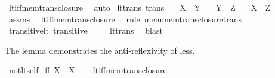 \begin{isabellebody}
\ lt{\isacharunderscore}{\kern0pt}iff{\isacharunderscore}{\kern0pt}mem{\isacharunderscore}{\kern0pt}trans{\isacharunderscore}{\kern0pt}closure\ \isamarkupfalse%
\ auto%
\endisatagproof
{\isafoldproof}%
%
\isadelimproof
\isanewline
%
\endisadelimproof
\isanewline
{}\isamarkupfalse%
\ lt{\isacharunderscore}{\kern0pt}trans\ {\isacharbrackleft}{\kern0pt}trans{\isacharbrackright}{\kern0pt}{\isacharcolon}{\kern0pt}\isanewline
\ \ \ {\isachardoublequoteopen}X\ {\isacharless}{\kern0pt}\ Y{\isachardoublequoteclose}\isanewline
\ \ \ {\isachardoublequoteopen}Y\ {\isacharless}{\kern0pt}\ Z{\isachardoublequoteclose}\isanewline
\ \ \ {\isachardoublequoteopen}X\ {\isacharless}{\kern0pt}\ Z{\isachardoublequoteclose}\isanewline
%
\isadelimproof
\ \ %
\endisadelimproof
%
\isatagproof
{}\isamarkupfalse%
\ assms\ \isamarkupfalse%
\ lt{\isacharunderscore}{\kern0pt}iff{\isacharunderscore}{\kern0pt}mem{\isacharunderscore}{\kern0pt}trans{\isacharunderscore}{\kern0pt}closure\ \isamarkupfalse%
\ {\isacharparenleft}{\kern0pt}rule\ mem{\isacharunderscore}{\kern0pt}mem{\isacharunderscore}{\kern0pt}trans{\isacharunderscore}{\kern0pt}closure{\isacharunderscore}{\kern0pt}trans{\isacharparenright}{\kern0pt}%
\endisatagproof
{\isafoldproof}%
%
\isadelimproof
\isanewline
%
\endisadelimproof
\isanewline
{}\isamarkupfalse%
\ transitive{\isacharunderscore}{\kern0pt}lt{\isacharcolon}{\kern0pt}\ {\isachardoublequoteopen}transitive\ {\isacharparenleft}{\kern0pt}{\isacharless}{\kern0pt}{\isacharparenright}{\kern0pt}{\isachardoublequoteclose}\isanewline
%
\isadelimproof
\ \ %
\endisadelimproof
%
\isatagproof
{}\isamarkupfalse%
\ lt{\isacharunderscore}{\kern0pt}trans\ \isamarkupfalse%
\ blast%
\endisatagproof
{\isafoldproof}%
%
\isadelimproof
%
\endisadelimproof
%
\begin{isamarkuptext}%
The lemma demonstrates the anti-reflexivity of less.%
\end{isamarkuptext}\isamarkuptrue%
\isamarkupfalse%
\ not{\isacharunderscore}{\kern0pt}lt{\isacharunderscore}{\kern0pt}self\ {\isacharbrackleft}{\kern0pt}iff{\isacharbrackright}{\kern0pt}{\isacharcolon}{\kern0pt}\ {\isachardoublequoteopen}{\isasymnot}{\isacharparenleft}{\kern0pt}X\ {\isacharless}{\kern0pt}\ X{\isacharparenright}{\kern0pt}{\isachardoublequoteclose}\isanewline
%
\isadelimproof
\ \ %
\endisadelimproof
%
\isatagproof
{}\isamarkupfalse%
\ lt{\isacharunderscore}{\kern0pt}iff{\isacharunderscore}{\kern0pt}mem{\isacharunderscore}{\kern0pt}trans{\isacharunderscore}{\kern0pt}closure\ \isamarkupfalse%

\end{isabellebody}
